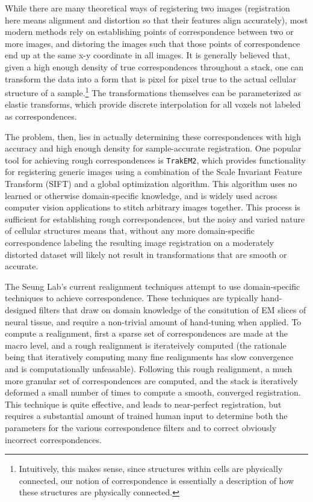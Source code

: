 While there are many theoretical ways of registering two images (registration here means alignment and distortion so that their features align accurately), most modern methods rely on establishing points of correspondence between two or more images, and distoring the images such that those points of correspondence end up at the same x-y coordinate in all images. It is generally believed that, given a high enough density of true correspondences throughout a stack, one can transform the data into a form that is pixel for pixel true to the actual cellular structure of a sample.\footnote{Intuitively, this makes sense, since structures within cells are physically connected, our notion of correspondence is essentially a description of how these structures are physically connected.} The transformations themselves can be parameterized as elastic transforms, which provide discrete interpolation for all voxels not labeled as correspondences.

The problem, then, lies in actually determining these correspondences with high accuracy and high enough density for sample-accurate registration. One popular tool for achieving rough correspondences is \texttt{TrakEM2}, which provides functionality for registering generic images using a combination of the Scale Invariant Feature Transform (SIFT) and a global optimization algorithm. This algorithm uses no learned or otherwise domain-specific knowledge, and is widely used across computer vision applications to stitch arbitrary images together. This process is sufficient for establishing rough correspondences, but the noisy and varied nature of cellular structures means that, without any more domain-specific correspondence labeling the resulting image registration on a moderately distorted dataset will likely not result in transformations that are smooth or accurate.

The Seung Lab's current realignment techniques attempt to use domain-specific techniques to achieve correspondence. These techniques are typically hand-designed filters that draw on domain knowledge of the consitution of EM slices of neural tissue, and require a non-trivial amount of hand-tuning when applied. To compute a realignment, first a sparse set of correspondences are made at the macro level, and a rough realignment is iterateively computed (the rationale being that iteratively computing many fine realignments has slow convergence and is computationally unfeasable). Following this rough realignment, a much more granular set of correspondences are computed, and the stack is iteratively deformed a small number of times to compute a smooth, converged registration. This technique is quite effective, and leads to near-perfect registration, but requires a substantial amount of trained human input to determine both the parameters for the various correspondence filters and to correct obviously incorrect correspondences.

